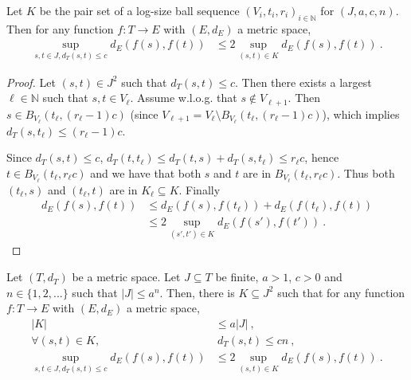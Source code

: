 \begin{lemma}\label{lem:sup_dist_le_two_mul_sup_dist_pairSet}
  \leanok
Let $K$ be the pair set of a log-size ball sequence $(V_i, t_i, r_i)_{i \in \mathbb{N}}$ for $(J, a, c, n)$.
Then for any function $f : T \to E$ with $(E,d_E)$ a metric space,
\begin{align*}
  \sup_{s,t\in J, d_T(s,t) \le c} d_E(f(s), f(t))
  & \le 2 \sup_{(s,t) \in K} d_E(f(s), f(t))
  \: .
\end{align*}
\end{lemma}

\begin{proof}
Let $(s, t) \in J^2$ such that $d_T(s, t) \le c$.
Then there exists a largest $\ell \in \mathbb{N}$ such that $s, t \in V_\ell$.
Assume w.l.o.g. that $s \notin V_{\ell + 1}$. Then $s \in B_{V_\ell}(t_\ell, (r_\ell-1)c)$ (since $V_{\ell + 1} = V_\ell \setminus B_{V_\ell}(t_\ell, (r_\ell-1)c)$), which implies $d_T(s, t_\ell) \le (r_\ell - 1)c$.

Since $d_T(s, t) \le c$, $d_T(t, t_\ell) \le d_T(t, s) + d_T(s, t_\ell) \le r_\ell c$, hence $t \in B_{V_\ell}(t_\ell, r_\ell c)$ and we have that both $s$ and $t$ are in $B_{V_\ell}(t_\ell, r_\ell c)$.
Thus both $(t_\ell, s)$ and $(t_\ell, t)$ are in $K_\ell \subseteq K$.
Finally
\begin{align*}
  d_E(f(s), f(t))
  &\le d_E(f(s), f(t_\ell)) + d_E(f(t_\ell), f(t))
  \\
  &\le 2\sup_{(s',t') \in K} d_E(f(s'), f(t'))
  \: .
\end{align*}
\end{proof}


\begin{lemma}\label{lem:pair_reduction}
  \leanok
Let $(T,d_T)$ be a metric space.
Let $J \subseteq T$ be finite, $a > 1$, $c>0$ and $n \in \{1, 2, ...\}$ such that $|J| \le a^n$.
Then, there is $K \subseteq J^2$ such that for any function $f : T \to E$ with $(E,d_E)$ a metric space,
\begin{align}
  |K|
  & \le a |J|
  \:, \label{eq:chain1} \\
  \forall (s,t) \in K,
  &\:  d_T(s,t) \le c n
  \:, \label{eq:chain2} \\
  \sup_{s,t\in J, d_T(s,t) \le c} d_E(f(s), f(t))
  & \le 2 \sup_{(s,t) \in K} d_E(f(s), f(t))
  \: . \label{eq:chain3}
\end{align}
\end{lemma}

